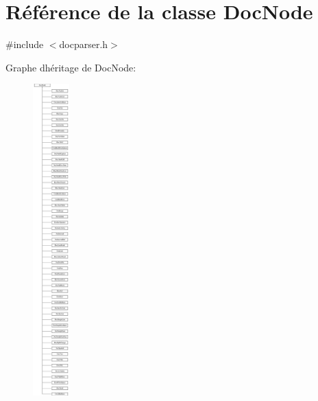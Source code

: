 \hypertarget{class_doc_node}{}\section{Référence de la classe Doc\+Node}
\label{class_doc_node}


{\ttfamily \#include $<$docparser.\+h$>$}

Graphe d\textquotesingle{}héritage de Doc\+Node\+:\begin{figure}[H]
\begin{center}
\leavevmode
\includegraphics[height=12.000000cm]{class_doc_node}
\end{center}
\end{figure}
